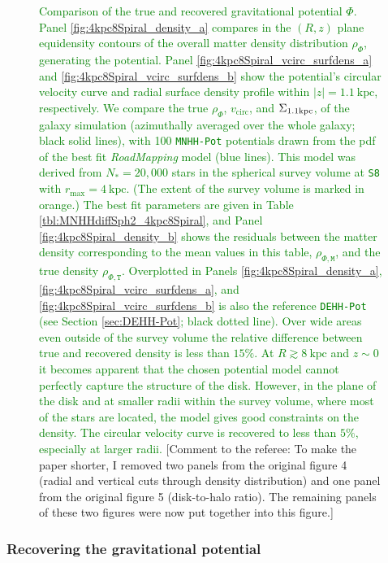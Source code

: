 \documentclass[iop,revtex4,numberedappendix,appendixfloats]{emulateapj}
\newcommand{\RM}{{\sl RoadMapping}}
\newcommand{\NEW}[1]{\textcolor{Green}{#1}}
\newcommand{\COMMENT}[1]{\textcolor{ProcessBlue}{#1}}
\begin{document}
\begin{figure}[!htbp]
\begin{minipage}{\textwidth}
    \end{minipage}
    \caption{\NEW{Comparison of the true and recovered gravitational potential $\Phi$. Panel \ref{fig:4kpc8Spiral_density_a} compares in the $(R,z)$ plane equidensity contours of the overall matter density distribution $\rho_{\Phi}$, generating the potential. Panel \ref{fig:4kpc8Spiral_vcirc_surfdens_a} and \ref{fig:4kpc8Spiral_vcirc_surfdens_b} show the potential's circular velocity curve and radial surface density profile within $|z|=1.1~\text{kpc}$, respectively. We compare the true $\rho_{\Phi}$, $v_\text{circ}$, and $\Sigma_{\rm 1.1kpc}$, of the galaxy simulation (azimuthally averaged over the whole galaxy; black solid lines), with 100 \texttt{MNHH-Pot} potentials drawn from the pdf of the best fit \RM{} model (blue lines). This model was derived from $N_*=20,000$ stars in the spherical survey volume at \texttt{S8} with $r_\text{max}=4~\text{kpc}$. (The extent of the survey volume is marked in orange.) The best fit parameters are given in Table \ref{tbl:MNHHdiffSph2_4kpc8Spiral}, and Panel \ref{fig:4kpc8Spiral_density_b} shows the residuals between the matter density corresponding to the mean values in this table, $\rho_{\Phi,\texttt{M}}$, and the true density  $\rho_{\Phi,\texttt{T}}$. Overplotted in Panels \ref{fig:4kpc8Spiral_density_a}, \ref{fig:4kpc8Spiral_vcirc_surfdens_a}, and \ref{fig:4kpc8Spiral_vcirc_surfdens_b} is also the reference \texttt{DEHH-Pot} (see Section \ref{sec:DEHH-Pot}; black dotted line). Over wide areas even outside of the survey volume the relative difference between true and recovered density is less than $15\%$. At $R\gtrsim8~\text{kpc}$ and $z\sim0$ it becomes apparent that the chosen potential model cannot perfectly capture the structure of the disk. However, in the plane of the disk and at smaller radii within the survey volume, where most of the stars are located, the model gives good constraints on the density. The circular velocity curve is recovered to less than $5\%$, especially at larger radii.} \COMMENT{[Comment to the referee: To make the paper shorter, I removed two panels from the original figure 4 (radial and vertical cuts through density distribution) and one panel from the original figure 5 (disk-to-halo ratio). The remaining panels of these two figures were now put together into this figure.]}}
\label{fig:4kpc8Spiral_dens_vcirc_surfdens}
\end{figure}

\subsubsection{Recovering the gravitational potential} \label{sec:4kpc8Spiral_potential}
\end{document}
